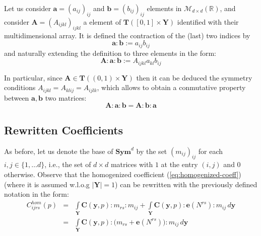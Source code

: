 \begin{defn}
Let us consider $\mathbf{a} = (a_{ij})_{ij}$ and $\mathbf{b} = (b_{ij})_{ij}$ elements in $\mathcal{M}_{d\times d}(\mathbb{R})$, and consider $\mathbf{A}=(A_{ijkl})_{ijkl}$ a element of $\mathbf{T}([0,1]\times \mathbf{Y})$ identified with their multidimensional array. It is defined the contraction of the (last) two indices by
\begin{equation*}
    \mathbf{a}:\mathbf{b} := a_{ij}b_{ij}
\end{equation*}
and naturally extending the definition to three elements in the form:
\begin{equation*}
    \mathbf{A}:\mathbf{a}:\mathbf{b} := A_{ijkl}a_{kl}b_{ij}
\end{equation*}
\end{defn}
\begin{rem}
In particular, since $\mathbf{A} \in \mathbf{T}((0,1)\times \mathbf{Y})$ then it can be deduced the symmetry conditions $A_{ijkl}=A_{klij}=A_{ijlk}$, which allows to obtain a conmutative property between $\mathbf{a},\mathbf{b}$ two matrices:
\begin{equation}
    \mathbf{A}: \mathbf{a}:\mathbf{b}= \mathbf{A}:\mathbf{b}:\mathbf{a}
\end{equation}
\end{rem}


\subsection{Rewritten Coefficients}
As before, let us denote the base of $\mathbf{Sym}^d$ by the set $(m_{ij})_{ij}$ for each $i,j \in \{1,\dots d\}$, i.e., the set of $d \times d$ matrices with $1$ at the entry $(i,j)$ and $0$ otherwise. Observe that the homogenized coefficient (\ref{eq:homogenized-coeff}) (where it is assumed w.l.o.g $\vert \mathbf{Y} \vert = 1$) can be rewritten with the previously defined notation in the form:
\begin{equation}
    \label{eq:effective_coef}
    \begin{array}{ccc}
        C_{ijrs}^{hom}(p) &=& \int\limits_{\mathbf{Y}} \mathbf{C}(\mathbf{y},p):m_{rs}:m_{ij} + \int\limits_{\mathbf{Y}} \mathbf{C}(\mathbf{y},p):\mathbf{e}(N^{rs}):m_{ij} \, d\mathbf{y} \\
         &=&\int\limits_{\mathbf{Y}} \mathbf{C}(\mathbf{y},p):\big(m_{rs} + \mathbf{e}(N^{rs})\big):m_{ij} \, d\mathbf{y}
    \end{array}
\end{equation}

